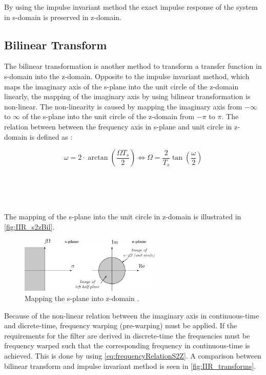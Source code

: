 By using the impulse invariant method the exact impulse response of the system in s-domain is preserved in z-domain.


\subsection{Bilinear Transform}

The bilinear transformation is another method to transform a transfer function in s-domain into the z-domain. Opposite to the impulse invariant method, which maps the imaginary axis of the s-plane into the unit circle of the z-domain linearly, the mapping of the imaginary axis by using bilinear transformation is non-linear. The non-linearity is caused by mapping the imaginary axis from $-\infty$ to $\infty$ of the s-plane into the unit circle of the z-domain from $-\pi$ to $\pi$. The relation between between the frequency axis in s-plane and unit circle in z-domain is defined as \citep{Oppenheim}:

\begin{equation} \label{eq:frequencyRelationS2Z}
\omega = 2 \cdot \arctan \left( \frac{\Omega T_s}{2} \right) \Leftrightarrow \Omega = \frac{2}{T_s} \tan \left( \frac{\omega}{2} \right)
\end{equation}
\begin{where}
\\
\\
\\
\end{where}


The mapping of the s-plane into the unit circle in z-domain is illustrated in \autoref{fig:IIR_s2zBil}.

\begin{figure}[H]
\centering
\includegraphics[width=0.6\textwidth]{figures/IIR_s2zBil}
\caption{Mapping the s-plane into z-domain \citep{Oppenheim}.}
\label{fig:IIR_s2zBil}
\end{figure}

Because of the non-linear relation between the imaginary axis in continuous-time and dicrete-time, frequency warping (pre-warping) must be applied. If the requirements for the filter are derived in discrete-time the frequencies must be frequency warped such that the corresponding frequency in continuous-time is achieved. This is done by using \autoref{eq:frequencyRelationS2Z}. A comparison between bilinear transform and impulse invariant method is seen in \autoref{fig:IIR_transforms}. 


